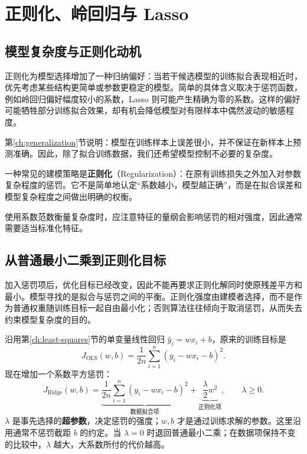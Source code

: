 \section{正则化、岭回归与 Lasso}\label{ch:regularization}

\subsection{模型复杂度与正则化动机}

正则化为模型选择增加了一种归纳偏好：当若干候选模型的训练拟合表现相近时，优先考虑某些结构更简单或参数更稳定的模型。简单的具体含义取决于惩罚函数，例如岭回归偏好幅度较小的系数，Lasso 则可能产生精确为零的系数。这样的偏好可能牺牲部分训练拟合效果，却有机会降低模型对有限样本中偶然波动的敏感程度。

第\ref{ch:generalization}节说明：模型在训练样本上误差很小，并不保证在新样本上预测准确。因此，除了拟合训练数据，我们还希望模型控制不必要的复杂度。

一种常见的建模策略是\textbf{正则化}（Regularization）：在原有训练损失之外加入对参数复杂程度的惩罚。它不是简单地认定“系数越小，模型越正确”，而是在拟合误差和模型复杂程度之间做出明确的权衡\cite[第11章]{zhou2016}。

使用系数范数衡量复杂度时，应注意特征的量纲会影响惩罚的相对强度，因此通常需要适当标准化特征。

\subsection{从普通最小二乘到正则化目标}

加入惩罚项后，优化目标已经改变，因此不能再要求正则化解同时使原残差平方和最小。模型寻找的是拟合与惩罚之间的平衡。正则化强度由建模者选择，而不是作为普通权重随训练目标一起自由最小化；否则算法往往倾向于取消惩罚，从而失去约束模型复杂度的目的。

沿用第\ref{ch:least-squares}节的单变量线性回归 $\hat y_i=wx_i+b$，原来的训练目标是
\[
J_{\mathrm{OLS}}(w,b)=\frac1{2n}\sum_{i=1}^{n}(y_i-wx_i-b)^2.
\]
现在增加一个系数平方惩罚：
\begin{equation}\label{eq:ridge-scalar}
\boxed{J_{\mathrm{Ridge}}(w,b)=
\underbrace{\frac1{2n}\sum_{i=1}^{n}(y_i-wx_i-b)^2}_{\text{数据拟合项}}
+\underbrace{\frac{\lambda}{2}w^2}_{\text{正则化项}},\qquad\lambda\geq0.}
\end{equation}
$\lambda$ 是事先选择的\textbf{超参数}，决定惩罚的强度；$w,b$ 才是通过训练求解的参数。这里沿用通常不惩罚截距 $b$ 的约定。当 $\lambda=0$ 时退回普通最小二乘；在数据项保持不变的比较中，$\lambda$ 越大，大系数所付的代价越高。

